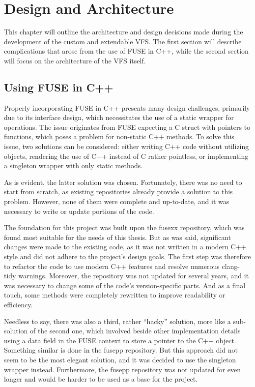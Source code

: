 \chapter{Design and Architecture}
\label{chap:design-and-architecture}

This chapter will outline the architecture and design decisions made during the development of the custom and extendable VFS\@.
The first section will describe complications that arose from the use of FUSE in C++, while the second section will focus on the architecture of the VFS itself.

\section{Using FUSE in C++}\label{sec:fuse-in-cpp}

Properly incorporating FUSE in C++ presents many design challenges, primarily due to its interface design, which necessitates the use of a static wrapper for operations.
The issue originates from FUSE expecting a C struct with pointers to functions, which poses a problem for non-static C++ methods.
To solve this issue, two solutions can be considered: either writing C++ code without utilizing objects, rendering the use of C++ instead of C rather pointless, or implementing a singleton wrapper with only static methods.

As is evident, the latter solution was chosen.
Fortunately, there was no need to start from scratch, as existing repositories already provide a solution to this problem.
However, none of them were complete and up-to-date, and it was necessary to write or update portions of the code.

The foundation for this project was built upon the fusexx\cite{fusexx} repository, which was found most suitable for the needs of this thesis.
But as was said, significant changes were made to the existing code, as it was not written in a modern C++ style and did not adhere to the project's design goals.
The first step was therefore to refactor the code to use modern C++ features and resolve numerous clang-tidy warnings.
Moreover, the repository was not updated for several years, and it was necessary to change some of the code's version-specific parts.
And as a final touch, some methods were completely rewritten to improve readability or efficiency.

Needless to say, there was also a third, rather ``hacky'' solution, more like a sub-solution of the second one, which involved beside other implementation details using a data field in the FUSE context to store a pointer to the C++ object.
Something similar is done in the fusepp\cite{fusepp} repository.
But this approach did not seem to be the most elegant solution, and it was decided to use the singleton wrapper instead.
Furthermore, the fusepp repository was not updated for even longer and would be harder to be used as a base for the project.


